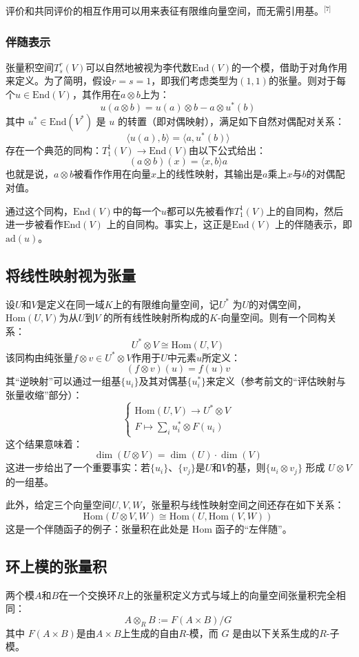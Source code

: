 评价和共同评价的相互作用可以用来表征有限维向量空间，而无需引用基。\(^\text{[7]}\)
\subsubsection{伴随表示}
张量积空间\( T^r_s(V) \)可以自然地被视为李代数\( \mathrm{End}(V) \)的一个模，借助于对角作用来定义。为了简明，假设\( r = s = 1 \)，即我们考虑类型为\((1,1)\)的张量。则对于每个\( u \in \mathrm{End}(V) \)，其作用在\( a \otimes b \)上为：
\[
u(a \otimes b) = u(a) \otimes b - a \otimes u^*(b)~
\]
其中 \( u^* \in \mathrm{End}(V^*) \) 是 \( u \) 的转置（即对偶映射），满足如下自然对偶配对关系：
\[
\langle u(a), b \rangle = \langle a, u^*(b) \rangle~
\]
存在一个典范的同构：\(T^1_1(V) \to \mathrm{End}(V)\)由以下公式给出：
\[
(a \otimes b)(x) = \langle x, b \rangle a~
\]
也就是说，\( a \otimes b \)被看作作用在向量\( x \)上的线性映射，其输出是\( a \)乘上\( x \)与\( b \)的对偶配对值。

通过这个同构，\( \mathrm{End}(V) \)中的每一个\( u \)都可以先被看作\( T^1_1(V) \)上的自同构，然后进一步被看作\( \mathrm{End}(V) \) 上的自同构。事实上，这正是\( \mathrm{End}(V) \) 上的伴随表示，即 \( \mathrm{ad}(u) \)。
\subsection{将线性映射视为张量}
设\( U \)和\( V \)是定义在同一域\( K \)上的有限维向量空间，记\( U^* \) 为\( U \)的对偶空间，\( \mathrm{Hom}(U, V) \)为从\( U \)到\( V \) 的所有线性映射所构成的\( K \)-向量空间。则有一个同构关系：
\[
U^* \otimes V \cong \mathrm{Hom}(U, V)~
\]
该同构由纯张量\( f \otimes v \in U^* \otimes V \)作用于\( U \)中元素\( u \)所定义：
\[
(f \otimes v)(u) = f(u)v~
\]
其“逆映射”可以通过一组基\( \{u_i\} \)及其对偶基\( \{u_i^*\} \)来定义（参考前文的“评估映射与张量收缩”部分）：
\[
\begin{cases}
\mathrm{Hom}(U, V) \to U^* \otimes V \\
F \mapsto \sum_i u_i^* \otimes F(u_i)
\end{cases}~
\]
这个结果意味着：
\[
\dim(U \otimes V) = \dim(U) \cdot \dim(V)~
\]
这进一步给出了一个重要事实：若\( \{u_i\} \)、\( \{v_j\} \)是\( U \)和\( V \)的基，则\( \{u_i \otimes v_j\} \) 形成 \( U \otimes V \)的一组基。

此外，给定三个向量空间\( U, V, W \)，张量积与线性映射空间之间还存在如下关系：
\[
\mathrm{Hom}(U \otimes V, W) \cong \mathrm{Hom}(U, \mathrm{Hom}(V, W))~
\]
这是一个伴随函子的例子：张量积在此处是 Hom 函子的“左伴随”。
\subsection{环上模的张量积}  
两个模\( A \)和\( B \)在一个交换环\( R \)上的张量积定义方式与域上的向量空间张量积完全相同：
\[
A \otimes_R B := F(A \times B)/G~
\]
其中 \( F(A \times B) \)是由\( A \times B \)上生成的自由\( R \)-模，而 \( G \) 是由以下关系生成的\( R \)-子模。

